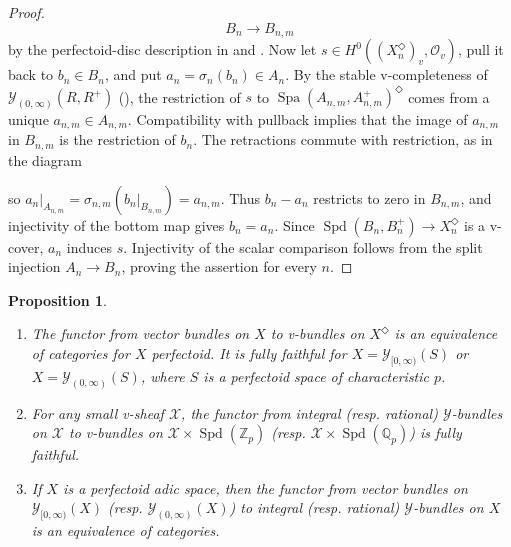 \documentclass[10pt,twoside]{article}
\numberwithin{equation}{section}
\theoremstyle{plain}
\newtheorem{myprop}[mythm]{Proposition}
\theoremstyle{definition}
\DeclareMathOperator{\Spa}{Spa}
\DeclareMathOperator{\Spd}{Spd}
\newcommand{\ZZ}{\mathbb{Z}}
\newcommand{\QQ}{\mathbb{Q}}
\newcommand{\MCO}{\mathcal{O}}
\newcommand{\MCX}{\mathcal{X}}
\newcommand{\MCY}{\mathcal{Y}}
\let \diamond \Diamond
\newcommand{\Yco}{\MCY_{[0,\infty)}}
\newcommand{\Yoo}{\MCY_{(0,\infty)}}
\begin{document}
\begin{proof}
    \[B_n\longrightarrow B_{n,m}\]
    by the perfectoid-disc description in \cite[Proposition II.1.1 and its proof]{FS21} and \cite[Theorem 5.2.1]{SW20}. Now let \(s\in H^0((X_n^\diamond)_v,\MCO_v)\), pull it back to \(b_n\in B_n\), and put \(a_n=\sigma_n(b_n)\in A_n\). By the stable v-completeness of \(\Yoo(R,R^+)\) (\cite[Proposition 9.9]{KimIgusa}), the restriction of \(s\) to \(\Spa(A_{n,m},A_{n,m}^+)^\diamond\) comes from a unique \(a_{n,m}\in A_{n,m}\). Compatibility with pullback implies that the image of \(a_{n,m}\) in \(B_{n,m}\) is the restriction of \(b_n\). The retractions commute with restriction, as in the diagram
\begin{center}
\end{center}
so \(a_n|_{A_{n,m}}=\sigma_{n,m}(b_n|_{B_{n,m}})=a_{n,m}\). Thus \(b_n-a_n\) restricts to zero in \(B_{n,m}\), and injectivity of the bottom map gives \(b_n=a_n\). Since \(\Spd(B_n,B_n^+)\to X_n^\diamond\) is a v-cover, \(a_n\) induces \(s\). Injectivity of the scalar comparison follows from the split injection \(A_n\to B_n\), proving the assertion for every \(n\).
\end{proof}



\begin{myprop}\label{baseChangeFunctorsProperties}
\begin{enumerate}
    \item The functor from vector bundles on \(X\) to v-bundles on \(X^\diamond\) is an equivalence of categories for \(X\) perfectoid. It is fully faithful for \(X=\Yco(S)\) or \(X=\Yoo(S)\), where \(S\) is a perfectoid space of characteristic \(p\).
    \item For any small v-sheaf \(\MCX\), the functor from integral (resp. rational) \(\MCY\)-bundles on \(\MCX\) to v-bundles on \(\MCX\times\Spd(\ZZ_p)\) (resp. \(\MCX\times\Spd(\QQ_p)\)) is fully faithful.
    \item If \(X\) is a perfectoid adic space, then the functor from vector bundles on \(\Yco(X)\) (resp. \(\Yoo(X)\)) to integral (resp. rational) \(\MCY\)-bundles on \(X\) is an equivalence of categories.
\end{enumerate}
\end{myprop}
\end{document}
